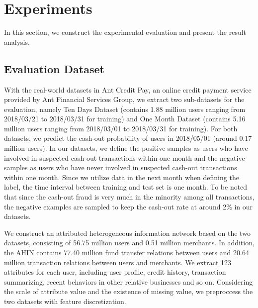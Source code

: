 \section{Experiments}
In this section, we construct the experimental evaluation and present the result analysis.


\subsection{Evaluation Dataset}
With the real-world datasets in Ant Credit Pay, an online credit payment service provided by Ant Financial Services Group,  we extract two sub-datasets for the evaluation, namely Ten Days Dataset (contains 1.88 million users ranging  from 2018/03/21 to 2018/03/31 for training) and One Month Dataset (contains 5.16 million users ranging from 2018/03/01 to 2018/03/31 for training). For both datasets, we predict the cash-out probability of users in 2018/05/01 (around 0.17 million users). In our datasets, we define the positive samples as users who have involved in suspected cash-out transactions within one month and the negative samples as users who have never involved in suspected cash-out transactions within one month. Since we utilize data in the next month when defining the label, the time interval between training and test set is one month. To be noted that since the cash-out fraud is very much in the minority among all transactions, the negative examples are sampled to keep the cash-out rate at around 2\% in our datasets.  

We construct an attributed heterogeneous information network based on the two datasets, consisting of  56.75 million users and 0.51 million merchants. In addition, the AHIN contains 77.40 million fund transfer relations between users and 20.64 million transaction relations between users and merchants. 
We extract 123 attributes for each user, including user profile, credit history, transaction summarizing, recent behaviors in other relative businesses and so on. Considering the scale of attribute value and the existence of missing value, we preproccess the two datasets with feature discretization.  

